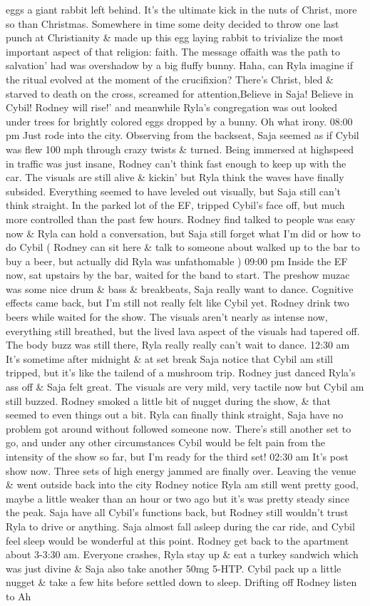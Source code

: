 \documentclass[12pt]{book}
\begin{document}
eggs a giant rabbit left behind. It's the ultimate kick in the nuts of Christ, more so than Christmas. Somewhere in time some deity decided to throw one last punch at Christianity \& made up this egg laying rabbit to trivialize the most important aspect of that religion: faith. The message offaith was the path to salvation' had was overshadow by a big fluffy bunny. Haha, can Ryla imagine if the ritual evolved at the moment of the crucifixion? There's Christ, bled \& starved to death on the cross, screamed for attention,Believe in Saja! Believe in Cybil! Rodney will rise!' and meanwhile Ryla's congregation was out looked under trees for brightly colored eggs dropped by a bunny. Oh what irony. 08:00 pm Just rode into the city. Observing from the backseat, Saja seemed as if Cybil was flew 100 mph through crazy twists \& turned. Being immersed at highspeed in traffic was just insane, Rodney can't think fast enough to keep up with the car. The visuals are still alive \& kickin' but Ryla think the waves have finally subsided. Everything seemed to have leveled out visually, but Saja still can't think straight. In the parked lot of the EF, tripped Cybil's face off, but much more controlled than the past few hours. Rodney find talked to people was easy now \& Ryla can hold a conversation, but Saja still forget what I'm did or how to do Cybil ( Rodney can sit here \& talk to someone about walked up to the bar to buy a beer, but actually did Ryla was unfathomable ) 09:00 pm Inside the EF now, sat upstairs by the bar, waited for the band to start. The preshow muzac was some nice drum \& bass \& breakbeats, Saja really want to dance. Cognitive effects came back, but I'm still not really felt like Cybil yet. Rodney drink two beers while waited for the show. The visuals aren't nearly as intense now, everything still breathed, but the lived lava aspect of the visuals had tapered off. The body buzz was still there, Ryla really really can't wait to dance. 12:30 am It's sometime after midnight \& at set break Saja notice that Cybil am still tripped, but it's like the tailend of a mushroom trip. Rodney just danced Ryla's ass off \& Saja felt great. The visuals are very mild, very tactile now but Cybil am still buzzed. Rodney smoked a little bit of nugget during the show, \& that seemed to even things out a bit. Ryla can finally think straight, Saja have no problem got around without followed someone now. There's still another set to go, and under any other circumstances Cybil would be felt pain from the intensity of the show so far, but I'm ready for the third set! 02:30 am It's post show now. Three sets of high energy jammed are finally over. Leaving the venue \& went outside back into the city Rodney notice Ryla am still went pretty good, maybe a little weaker than an hour or two ago but it's was pretty steady since the peak. Saja have all Cybil's functions back, but Rodney still wouldn't trust Ryla to drive or anything. Saja almost fall asleep during the car ride, and Cybil feel sleep would be wonderful at this point. Rodney get back to the apartment about 3-3:30 am. Everyone crashes, Ryla stay up \& eat a turkey sandwich which was just divine \& Saja also take another 50mg 5-HTP. Cybil pack up a little nugget \& take a few hits before settled down to sleep. Drifting off Rodney listen to Ah 
\end{document}
